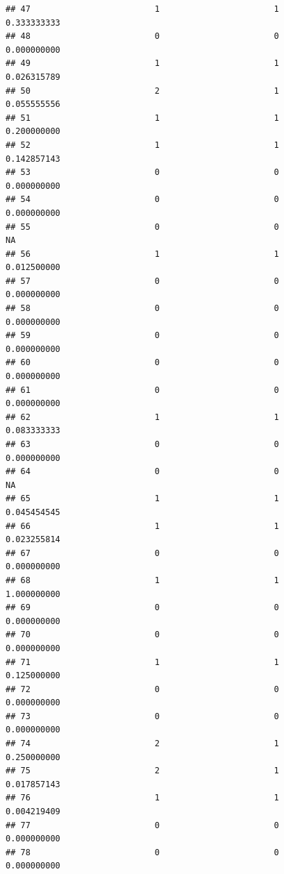 \documentclass[
]{article}
\begin{document}
\begin{verbatim}
## 47                         1                       1               0.333333333
## 48                         0                       0               0.000000000
## 49                         1                       1               0.026315789
## 50                         2                       1               0.055555556
## 51                         1                       1               0.200000000
## 52                         1                       1               0.142857143
## 53                         0                       0               0.000000000
## 54                         0                       0               0.000000000
## 55                         0                       0                        NA
## 56                         1                       1               0.012500000
## 57                         0                       0               0.000000000
## 58                         0                       0               0.000000000
## 59                         0                       0               0.000000000
## 60                         0                       0               0.000000000
## 61                         0                       0               0.000000000
## 62                         1                       1               0.083333333
## 63                         0                       0               0.000000000
## 64                         0                       0                        NA
## 65                         1                       1               0.045454545
## 66                         1                       1               0.023255814
## 67                         0                       0               0.000000000
## 68                         1                       1               1.000000000
## 69                         0                       0               0.000000000
## 70                         0                       0               0.000000000
## 71                         1                       1               0.125000000
## 72                         0                       0               0.000000000
## 73                         0                       0               0.000000000
## 74                         2                       1               0.250000000
## 75                         2                       1               0.017857143
## 76                         1                       1               0.004219409
## 77                         0                       0               0.000000000
## 78                         0                       0               0.000000000

\end{verbatim}
\end{document}
